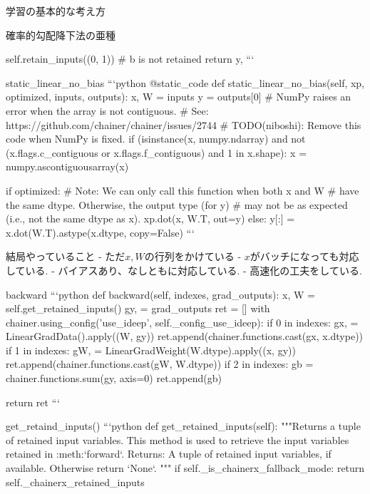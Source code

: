 \begin{frame}[fragile]{学習の基本的な考え方}
\begin{frame}[fragile]{確率的勾配降下法の亜種}
\begin{frame}[fragile]{}
        self.retain_inputs((0, 1))  # b is not retained
        return y,
```

\end{frame}
\begin{frame}[fragile]{}static_linear_no_bias
```python
    @static_code
    def static_linear_no_bias(self, xp, optimized, inputs, outputs):
        x, W = inputs
        y = outputs[0]
        # NumPy raises an error when the array is not contiguous.
        # See: https://github.com/chainer/chainer/issues/2744
        # TODO(niboshi): Remove this code when NumPy is fixed.
        if (isinstance(x, numpy.ndarray) and
                not (x.flags.c_contiguous or x.flags.f_contiguous) and
                1 in x.shape):
            x = numpy.ascontiguousarray(x)

        if optimized:
            # Note: We can only call this function when both x and W
            # have the same dtype. Otherwise, the output type (for y)
            # may not be as expected (i.e., not the same dtype as x).
            xp.dot(x, W.T, out=y)
        else:
            y[:] = x.dot(W.T).astype(x.dtype, copy=False)
```

\end{frame}
\begin{frame}[fragile]{}結局やっていること
- ただ$x, W$の行列をかけている
- $x$がバッチになっても対応している.
- バイアスあり、なしともに対応している.
- 高速化の工夫をしている.


\end{frame}
\begin{frame}[fragile]{}backward
```python
    def backward(self, indexes, grad_outputs):
        x, W = self.get_retained_inputs()
        gy, = grad_outputs
        ret = []
        with chainer.using_config('use_ideep', self._config_use_ideep):
            if 0 in indexes:
                gx, = LinearGradData().apply((W, gy))
                ret.append(chainer.functions.cast(gx, x.dtype))
            if 1 in indexes:
                gW, = LinearGradWeight(W.dtype).apply((x, gy))
                ret.append(chainer.functions.cast(gW, W.dtype))
            if 2 in indexes:
                gb = chainer.functions.sum(gy, axis=0)
                ret.append(gb)

        return ret
```

\end{frame}
\begin{frame}[fragile]{}get_retaind_inputs()
```python
    def get_retained_inputs(self):
        """Returns a tuple of retained input variables.
        This method is used to retrieve the input variables retained in
        :meth:`forward`.
        Returns:
            A tuple of retained input variables, if available. Otherwise
            return `None`.
        """
        if self._is_chainerx_fallback_mode:
            return self._chainerx_retained_inputs


\end{frame}
\end{frame}
\end{frame}
